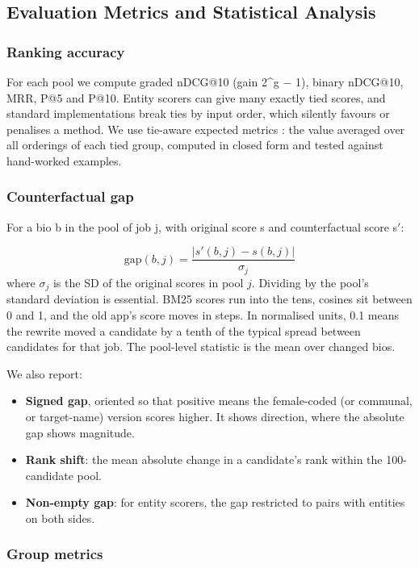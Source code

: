 \documentclass[conference,a4paper]{IEEEtran}
\begin{document}
\subsection{Evaluation Metrics and Statistical Analysis}
\subsubsection{Ranking accuracy} For each pool we compute graded nDCG@10 (gain 2\textasciicircum{}g $-$ 1), binary nDCG@10, MRR, P@5 and P@10. Entity scorers can give many exactly tied scores, and standard implementations break ties by input order, which silently favours or penalises a method. We use tie-aware expected metrics \cite{mcsherry}: the value averaged over all orderings of each tied group, computed in closed form and tested against hand-worked examples.

\subsubsection{Counterfactual gap} For a bio b in the pool of job j, with original score s and counterfactual score s$'$:

\begin{equation}
\mathrm{gap}(b, j) = \frac{\lvert s'(b, j) - s(b, j) \rvert}{\sigma_j}
\end{equation}
where $\sigma_j$ is the SD of the original scores in pool $j$.
Dividing by the pool's standard deviation is essential. BM25 scores run into the tens, cosines sit between 0 and 1, and the old app's score moves in steps. In normalised units, 0.1 means the rewrite moved a candidate by a tenth of the typical spread between candidates for that job. The pool-level statistic is the mean over changed bios.

We also report:

\begin{itemize}
\item \textbf{Signed gap}, oriented so that positive means the female-coded (or communal, or target-name) version scores higher. It shows direction, where the absolute gap shows magnitude.
\item \textbf{Rank shift}: the mean absolute change in a candidate's rank within the 100-candidate pool.
\item \textbf{Non-empty gap}: for entity scorers, the gap restricted to pairs with entities on both sides.
\end{itemize}
\subsubsection{Group metrics} 
\end{document}
